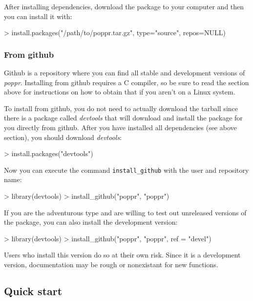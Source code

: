\documentclass[letterpaper]{article}
\newcommand{\tab}{\hspace*{1em}}
\begin{document}
After installing dependencies, download the package to your computer and then you can install it with:
\begin{Schunk}
\begin{Sinput}
> install.packages("/path/to/poppr.tar.gz", type="source", repos=NULL)
\end{Sinput}
\end{Schunk}

\subsubsection{From github}
\tab\tab Github is a repository where you can find all stable and development versions of \textit{poppr}. Installing from github requires a C compiler, so be sure to read the section above for instructions on how to obtain that if you aren't on a Linux system. 

To install from github, you do not need to actually download the tarball since there is a package called \textit{devtools} that will download and install the package for you directly from github. After you have installed all dependencies (see above section), you should download \textit{devtools}:
\begin{Schunk}
\begin{Sinput}
> install.packages("devtools")
\end{Sinput}
\end{Schunk}
Now you can execute the command \texttt{install\_github} with the user and repository name:
\begin{Schunk}
\begin{Sinput}
> library(devtools)
> install_github("poppr", "poppr")
\end{Sinput}
\end{Schunk}

If you are the adventurous type and are willing to test out unreleased versions of the package, you can also install the development version:
\begin{Schunk}
\begin{Sinput}
> library(devtools)
> install_github("poppr", "poppr", ref = "devel")
\end{Sinput}
\end{Schunk}
Users who install this version do so at their own risk. Since it is a development version, documentation may be rough or nonexistant for new functions. 

\subsection{Quick start}\label{intro:qstart}
\end{document}
